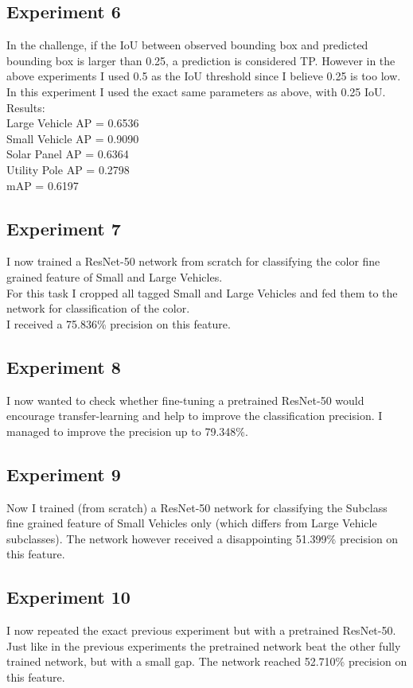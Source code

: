 \documentclass[]{article}
\begin{document}
\subsection{Experiment 6}
In the challenge, if the IoU between observed bounding box and predicted bounding box is larger than 0.25, a prediction is considered TP. However in the above experiments I used 0.5 as the IoU threshold since I believe 0.25 is too low. In this experiment I used the exact same parameters as above, with 0.25 IoU.
Results:\\
Large Vehicle AP = 0.6536\\
Small Vehicle AP = 0.9090\\
Solar Panel AP = 0.6364\\
Utility Pole AP = 0.2798\\
mAP = 0.6197

\subsection{Experiment 7}
I now trained a ResNet-50 \cite{resnet} network from scratch for classifying the color fine grained feature of Small and Large Vehicles.\\
For this task I cropped all tagged Small and Large Vehicles and fed them to the network for classification of the color.\\
I received a 75.836\% precision on this feature.

\subsection{Experiment 8}
I now wanted to check whether fine-tuning a pretrained ResNet-50 \cite{resnet} would encourage transfer-learning and help to improve the classification precision.
I managed to improve the precision up to 79.348\%.

\subsection{Experiment 9}
Now I trained (from scratch) a ResNet-50 network for classifying the Subclass fine grained feature of Small Vehicles only (which differs from Large Vehicle subclasses).
The network however received a disappointing 51.399\% precision on this feature.

\subsection{Experiment 10}
I now repeated the exact previous experiment but with a pretrained ResNet-50.\\
Just like in the previous experiments the pretrained network beat the other fully trained network, but with a small gap. The network reached 52.710\% precision on this feature.
\end{document}
